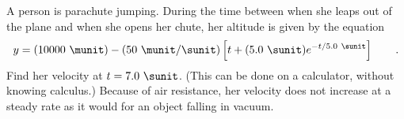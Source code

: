   A person is parachute jumping.  During the time between
when she leaps out of the plane and when she opens her
chute, her altitude is given by the equation
\begin{equation*}
        y = (10000\ \munit) - (50\ \munit/\sunit)\left[t+(5.0\ \sunit)e^{-t/5.0\ \sunit}\right]   \qquad   .
\end{equation*}
Find her velocity at $t=7.0\ \sunit$.  (This can be done on a
calculator, without knowing calculus.) Because of air
resistance, her velocity does not increase at a steady rate
as it would for an object falling in vacuum. \answercheck

